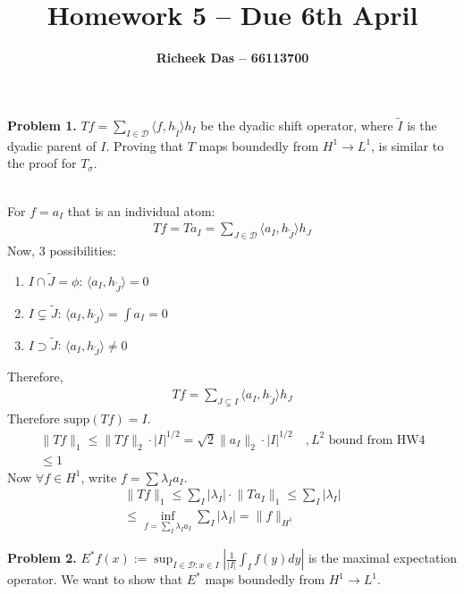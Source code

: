 \documentclass{article}
\title{Homework 5 --  Due 6th April}
\author{\textbf{Richeek Das -- 66113700}}
\newcommand{\D}{\mathcal{D}}
\newcommand{\supp}{\text{supp}}
\begin{document}
\maketitle

\textbf{Problem 1. } $Tf = \sum_{I \in \D} \langle f, h_{\tilde{I}}\rangle h_I$ be the dyadic shift operator, where $\tilde{I}$ is the dyadic parent of $I$. Proving that $T$ maps boundedly from $H^1\to L^1$, is similar to the proof for $T_{\sigma}$.
\\~

For $f = a_I$ that is an individual atom:
\begin{gather*}
    Tf = Ta_I = \sum_{J \in \D} \langle a_I, h_{\tilde{J}} \rangle h_J
\end{gather*}
Now, 3 possibilities:
\begin{enumerate}
    \item $I \cap \tilde{J} = \phi$: $\langle a_I, h_{\tilde{J}} \rangle = 0$

    \item $I \subsetneq \tilde{J}$: $\langle a_I, h_{\tilde{J}} \rangle = \int a_I = 0$

    \item $I \supset \tilde{J}$: $\langle a_I, h_{\tilde{J}} \rangle \neq 0$
\end{enumerate}
Therefore,
\begin{gather*}
    Tf = \sum_{J \subsetneq I} \langle a_I, h_{\tilde{J}} \rangle h_J
\end{gather*}
Therefore $\supp (Tf) = I$.
\begin{gather*}
    \lVert Tf \rVert_1 \leq \lVert Tf \rVert_2  \cdot |I|^{1/2} = \sqrt{2}\lVert a_I \rVert_{2} \cdot |I|^{1/2} \quad ,L^2 \text{ bound from HW4}\\
    \leq 1
\end{gather*}
Now $\forall f \in H^1$, write $f = \sum \lambda_I a_I$.
\begin{gather*}
    \lVert Tf \rVert_1 \leq \sum_I |\lambda_I| \cdot \lVert Ta_I \rVert_1 \leq \sum_I |\lambda_I| \\
    \leq \inf_{f = \sum_{I} \lambda_I a_I} \sum_I |\lambda_I| = \lVert f \rVert_{H^1}
\end{gather*}
\clearpage


\textbf{Problem 2. } $E^* f(x) := \sup_{I \in \D:x \in I} \left| \frac{1}{|I|} \int_I f(y)dy \right|$ is the maximal expectation operator. We want to show that $E^*$ maps boundedly from $H^1 \to L^1$.
\\~
\end{document}
